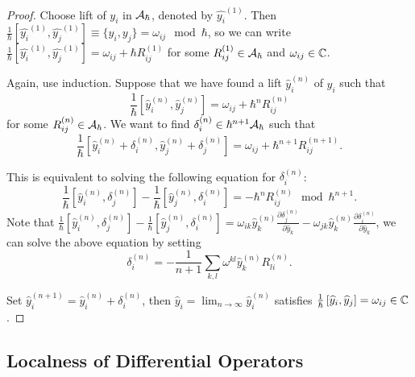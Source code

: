 \begin{proof}
  Choose lift of $y_i$ in $\mathcal{A}_{\hbar}$, denoted by $\widehat{y_i}^{(1)}$. Then $\frac{1}{\hbar}\left[\widehat{y_i}^{(1)}, \widehat{y_j}^{(1)}\right] \equiv \{y_i, y_j\} = \omega_{ij} \mod \hbar$, so we can write $\frac{1}{\hbar}\left[\widehat{y_i}^{(1)}, \widehat{y_j}^{(1)}\right] = \omega_{ij} + \hbar R_{ij}^{(1)}$ for some $R_{ij}^{(1)} \in \mathcal{A}_{\hbar}$ and $\omega_{ij} \in \mathbb{C}$.

  Again, use induction. Suppose that we have found a lift $\widehat{y}_i^{(n)}$ of $y_i$ such that
  \[
    \frac{1}{\hbar}\left[\widehat{y}_i^{(n)}, \widehat{y}_j^{(n)}\right]
      = \omega_{ij} + \hbar^{n} R_{ij}^{(n)}
  \]
  for some $R_{ij}^{(n)} \in \mathcal{A}_{\hbar}$. We want to find
  $\delta_i^{(n)} \in \hbar^{n+1} \mathcal{A}_{\hbar}$ such that
  \[
    \frac{1}{\hbar}
    \left[\widehat{y}_i^{(n)} + \delta_i^{(n)},
          \widehat{y}_j^{(n)} + \delta_j^{(n)}\right]
      = \omega_{ij} + \hbar^{n+1} R_{ij}^{(n+1)}.
  \]

  This is equivalent to solving the following equation for $\delta_i^{(n)}$:
  \[\frac{1}{\hbar}\left[\widehat{y}_i^{(n)}, \delta_j^{(n)}\right] - \frac{1}{\hbar}\left[\widehat{y}_j^{(n)}, \delta_i^{(n)}\right] = -\hbar^{n} R_{ij}^{(n)} \mod \hbar^{n+1}.\]
  Note that $\frac{1}{\hbar}\left[\widehat{y}_i^{(n)}, \delta_j^{(n)}\right] - \frac{1}{\hbar}\left[\widehat{y}_j^{(n)}, \delta_i^{(n)}\right] = \omega_{ik} \widehat{y}_k^{(n)}\frac{\partial \delta_j^{(n)}}{\partial \widehat{y}_k} - \omega_{jk} \widehat{y}_k^{(n)}\frac{\partial \delta_i^{(n)}}{\partial \widehat{y}_k}$, we can solve the above equation by setting
\[\delta_i^{(n)} = -\frac{1}{n+1} \sum_{k,l} \omega^{kl} \widehat{y}_k^{(n)} R_{li}^{(n)}.\]

  Set $\widehat{y}_i^{(n+1)} = \widehat{y}_i^{(n)} + \delta_i^{(n)}$, then $\widehat{y}_i = \lim_{n \to \infty} \widehat{y}_i^{(n)}$ satisfies $\frac{1}{\hbar}\left[\widehat{y}_i, \widehat{y}_j\right] = \omega_{ij} \in \mathbb{C}$.
\end{proof}


\subsection{Localness of Differential Operators}

